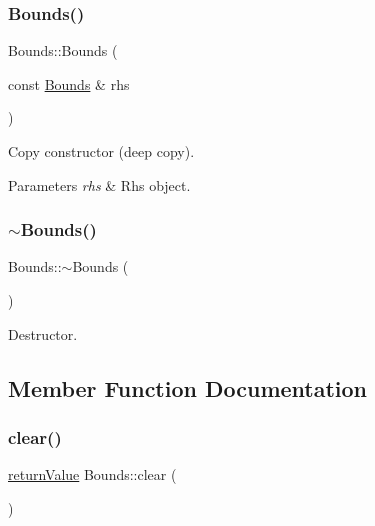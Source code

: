 \subsubsection{\texorpdfstring{Bounds()}{Bounds()}\hspace{0.1cm}{\footnotesize\ttfamily [3/3]}}
{\footnotesize\ttfamily Bounds\+::\+Bounds (\begin{DoxyParamCaption}\item[{const \hyperlink{class_bounds}{Bounds} \&}]{rhs }\end{DoxyParamCaption})}

Copy constructor (deep copy). 
\begin{DoxyParams}{Parameters}
{\em rhs} & Rhs object. \\
\hline
\end{DoxyParams}
\mbox{\label{class_bounds_aed8643720e1ca9c1da0b902aec80d3c4}} 
\subsubsection{\texorpdfstring{$\sim$\+Bounds()}{~Bounds()}}
{\footnotesize\ttfamily Bounds\+::$\sim$\+Bounds (\begin{DoxyParamCaption}{ }\end{DoxyParamCaption})\hspace{0.3cm}{\ttfamily [virtual]}}

Destructor. 

\subsection{Member Function Documentation}
\mbox{\label{class_bounds_ad19e200f0cd0b476f5630d2516eb4d4c}} 
\subsubsection{\texorpdfstring{clear()}{clear()}}
{\footnotesize\ttfamily \hyperlink{_message_handling_8hpp_a81d556f613bfbabd0b1f9488c0fa865e}{return\+Value} Bounds\+::clear (\begin{DoxyParamCaption}{ }\end{DoxyParamCaption})\hspace{0.3cm}{\ttfamily [protected]}}

